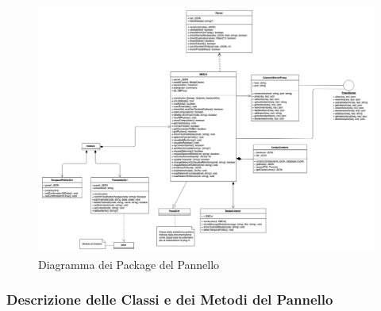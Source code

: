 \begin{landscape}
	\begin{figure}[H]
		\begin{center}
			\includegraphics[scale=0.30]{./images/panelClassi.png} 
		\end{center}
		\caption{Diagramma dei Package del Pannello}
	\end{figure}
\end{landscape}

\subsubsection{Descrizione delle Classi e dei Metodi del Pannello}\label{classiPannelloDescrizione}

